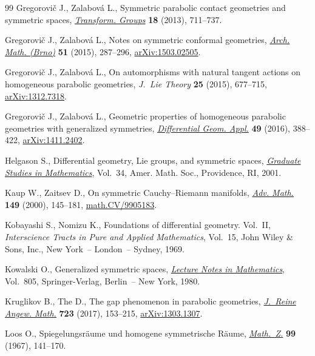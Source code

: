 \begin{thebibliography}{99}
Gregorovi\v{c} J., Zalabov\'a L., Symmetric parabolic contact geometries and
 symmetric spaces, \href{https://doi.org/10.1007/s00031-013-9231-z}{\textit{Transform. Groups}} \textbf{18} (2013), 711--737.

Gregorovi\v{c} J., Zalabov\'a L., Notes on symmetric conformal geometries,
 \href{https://doi.org/10.5817/AM2015-5-287}{\textit{Arch. Math. (Brno)}} \textbf{51} (2015), 287--296,
 \href{http://arxiv.org/abs/1503.02505}{arXiv:1503.02505}.

Gregorovi\v{c} J., Zalabov\'a L., On automorphisms with natural tangent actions
 on homogeneous parabolic geometries, \textit{J.~Lie Theory} \textbf{25}
 (2015), 677--715, \href{http://arxiv.org/abs/1312.7318}{arXiv:1312.7318}.

Gregorovi\v{c} J., Zalabov\'a L., Geometric properties of homogeneous parabolic
 geometries with generalized symmetries, \href{https://doi.org/10.1016/j.difgeo.2016.09.008}{\textit{Differential Geom. Appl.}}
 \textbf{49} (2016), 388--422, \href{http://arxiv.org/abs/1411.2402}{arXiv:1411.2402}.

Helgason S., Dif\/ferential geometry, {L}ie groups, and symmetric spaces,
 \href{https://doi.org/10.1090/gsm/034}{\textit{Graduate Studies in Mathematics}}, Vol.~34, Amer. Math. Soc.,
 Providence, RI, 2001.

Kaup W., Zaitsev D., On symmetric {C}auchy--{R}iemann manifolds, \href{https://doi.org/10.1006/aima.1999.1863}{\textit{Adv.
 Math.}} \textbf{149} (2000), 145--181, \href{http://arxiv.org/abs/math.CV/9905183}{math.CV/9905183}.

Kobayashi S., Nomizu K., Foundations of dif\/ferential geometry. {V}ol.~{II},
 \textit{Interscience Tracts in Pure and Applied Mathematics}, Vol.~15, John
 Wiley \& Sons, Inc., New York~-- London~-- Sydney, 1969.

Kowalski O., Generalized symmetric spaces, \href{https://doi.org/10.1007/BFb0103324}{\textit{Lecture Notes in
 Mathematics}}, Vol.~805, Springer-Verlag, Berlin~-- New York, 1980.

Kruglikov B., The D., The gap phenomenon in parabolic geometries,
 \href{https://doi.org/10.1515/crelle-2014-0072}{\textit{J.~Reine Angew. Math.}} \textbf{723} (2017), 153--215,
 \href{http://arxiv.org/abs/1303.1307}{arXiv:1303.1307}.

Loos O., Spiegelungsr\"aume und homogene symmetrische {R}\"aume,
 \href{https://doi.org/10.1007/BF01123745}{\textit{Math.~Z.}} \textbf{99} (1967), 141--170.


\end{thebibliography}
